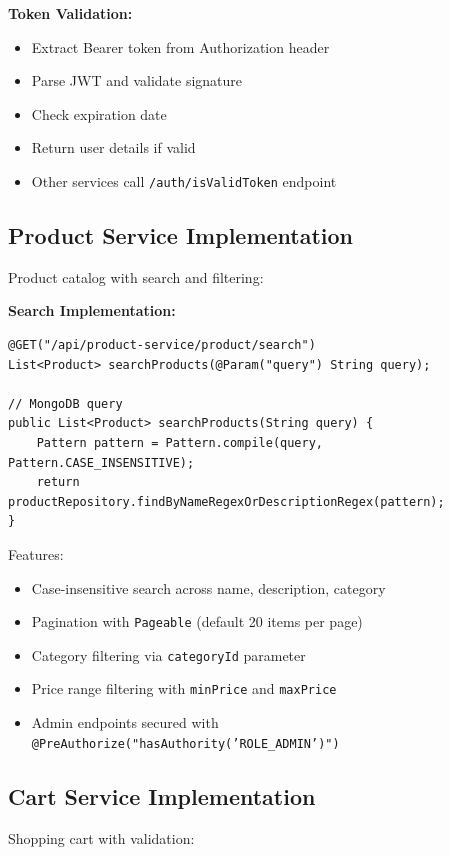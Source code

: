 \textbf{Token Validation:}
\begin{itemize}
    \item Extract Bearer token from Authorization header
    \item Parse JWT and validate signature
    \item Check expiration date
    \item Return user details if valid
    \item Other services call \texttt{/auth/isValidToken} endpoint
\end{itemize}

\subsection{Product Service Implementation}

Product catalog with search and filtering:

\textbf{Search Implementation:}
\begin{verbatim}
@GET("/api/product-service/product/search")
List<Product> searchProducts(@Param("query") String query);

// MongoDB query
public List<Product> searchProducts(String query) {
    Pattern pattern = Pattern.compile(query, Pattern.CASE_INSENSITIVE);
    return productRepository.findByNameRegexOrDescriptionRegex(pattern);
}
\end{verbatim}

Features:
\begin{itemize}
    \item Case-insensitive search across name, description, category
    \item Pagination with \texttt{Pageable} (default 20 items per page)
    \item Category filtering via \texttt{categoryId} parameter
    \item Price range filtering with \texttt{minPrice} and \texttt{maxPrice}
    \item Admin endpoints secured with \texttt{@PreAuthorize("hasAuthority('ROLE\_ADMIN')")}
\end{itemize}

\subsection{Cart Service Implementation}

Shopping cart with validation:

